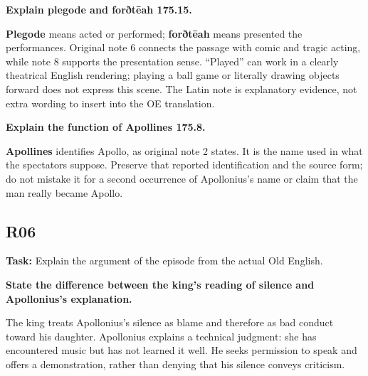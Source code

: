 \textbf{Explain plegode and forðtēah 175.15.}

\textbf{Plegode} means acted or performed; \textbf{forðtēah} means presented the performances. Original note 6 connects the passage with comic and tragic acting, while note 8 supports the presentation sense. “Played” can work in a clearly theatrical English rendering; playing a ball game or literally drawing objects forward does not express this scene. The Latin note is explanatory evidence, not extra wording to insert into the OE translation.

\par\begin{minipage}{\linewidth}\raggedright
\textbf{Explain the function of Apollines 175.8.}

\textbf{Apollines} identifies Apollo, as original note 2 states. It is the name used in what the spectators suppose. Preserve that reported identification and the source form; do not mistake it for a second occurrence of Apollonius's name or claim that the man really became Apollo.
\end{minipage}\par


\subsection*{R06}

\textbf{Task:} Explain the argument of the episode from the actual Old English.

\textbf{State the difference between the king’s reading of silence and Apollonius’s explanation.}

The king treats Apollonius's silence as blame and therefore as bad conduct toward his daughter. Apollonius explains a technical judgment: she has encountered music but has not learned it well. He seeks permission to speak and offers a demonstration, rather than denying that his silence conveys criticism.

